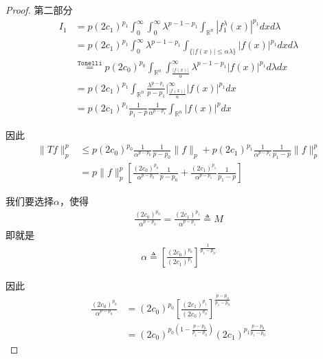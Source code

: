\begin{proof}
    第二部分
    \begin{align*}
        I_1 & = p (2c_1)^{p_1} \int_0^{\infty} \int_0^{\infty} \lambda^{p-1-p_1} \int_{\mathbb{R}^n} |f_1^{\lambda}(x)|^{p_1} dx d\lambda \\
        & = p (2c_1)^{p_1} \int_0^{\infty} \lambda^{p-1-p_1} \int_{\{|f(x)| \leqslant \alpha\lambda \}} |f(x)|^{p_1} dxd\lambda \\
        & \overset{\texttt{Tonelli}}{=} p(2c_0)^{p_0} \int_{\mathbb{R}^n} \int_{\frac{|f(x)|}{\alpha}}^{\infty} \lambda^{p-1-p_1} |f(x)|^{p_1} d\lambda dx \\
        & = p(2c_1)^{p_1} \int_{\mathbb{R}^n} \frac{\lambda^{p-p_1}}{p-p_1}\bigg|_{\frac{|f(x)|}{\alpha}}^{\infty} |f(x)|^{p_1} dx \\
        & = p(2c_1)^{p_1} \frac{1}{p_1 - p} \frac{1}{\alpha^{p-p_1}} \int_{\mathbb{R}^n} |f(x)|^p dx
    \end{align*}

    因此
    \begin{align*}
        \|Tf\|_p^p &\leqslant p (2c_0)^{p_0} \frac{1}{\alpha^{p-p_0}} \frac{1}{p-p_0} \|f\|_p + p(2c_1)^{p_1} \frac{1}{\alpha^{p-p_1}} \frac{1}{p_1-p} \|f\|_p^p \\
        & = p \|f\|_p^p \left[\frac{(2c_0)^{p_0}}{\alpha^{p-p_0}} \frac{1}{p-p_0} + \frac{(2c_1)^{p_1}}{\alpha^{p-p_1}}\frac{1}{p_1-p} \right]
    \end{align*}

    我们要选择$\alpha$，使得
    \begin{align*}
        \frac{(2c_0)^{p_0}}{\alpha^{p-p_0}} = \frac{(2c_1)^{p_1}}{\alpha^{p-p_1}} \triangleq M
    \end{align*}
    即就是
    \begin{align*}
        \alpha \triangleq \left[ \frac{(2c_0)^{p_0}}{(2c_1)^{p_1}} \right]^{\frac{1}{p_1 - p_0}}
    \end{align*}

    因此
    \begin{align*}
        \frac{(2c_0)^{p_0}}{\alpha^{p-p_0}} &= (2c_0)^{p_0} \left[ \frac{(2c_1)^{p_1}}{(2c_0)^{p_0}} \right]^{\frac{p-p_0}{p_1 - p_0}} \\
        & = (2c_0)^{p_0\left(1 - \frac{p - p_0}{p_1 - p_0}\right)} (2c_1)^{p_1 \frac{p - p_0}{p_1 - p_0}} 
    \end{align*}


\end{proof}
